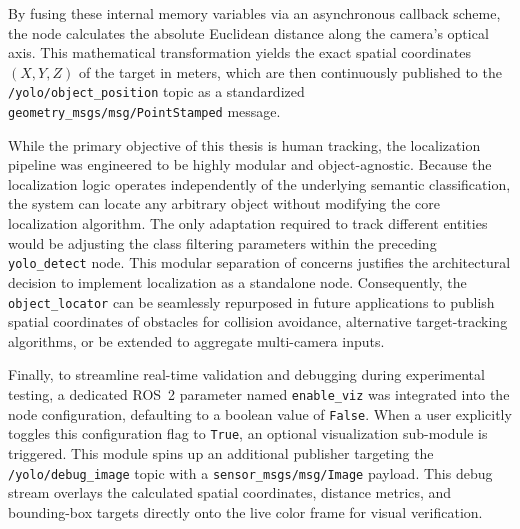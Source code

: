 By fusing these internal memory variables via an asynchronous callback scheme, the node calculates the absolute Euclidean distance along the camera’s optical axis. This mathematical transformation yields the exact spatial coordinates $(X, Y, Z)$ of the target in meters, which are then continuously published to the \texttt{/yolo/object\_position} topic as a standardized \texttt{geometry\_msgs/msg/PointStamped} message.

While the primary objective of this thesis is human tracking, the localization pipeline was engineered to be highly modular and object-agnostic. Because the localization logic operates independently of the underlying semantic classification, the system can locate any arbitrary object without modifying the core localization algorithm. The only adaptation required to track different entities would be adjusting the class filtering parameters within the preceding \texttt{yolo\_detect} node. This modular separation of concerns justifies the architectural decision to implement localization as a standalone node. Consequently, the \texttt{object\_locator} can be seamlessly repurposed in future applications to publish spatial coordinates of obstacles for collision avoidance, alternative target-tracking algorithms, or be extended to aggregate multi-camera inputs.

%

Finally, to streamline real-time validation and debugging during experimental testing, a dedicated ROS~2 parameter named \texttt{enable\_viz} was integrated into the node configuration, defaulting to a boolean value of \texttt{False}. When a user explicitly toggles this configuration flag to \texttt{True}, an optional visualization sub-module is triggered. This module spins up an additional publisher targeting the \texttt{/yolo/debug\_image} topic with a \texttt{sensor\_msgs/msg/Image} payload. This debug stream overlays the calculated spatial coordinates, distance metrics, and bounding-box targets directly onto the live color frame for visual verification. %


